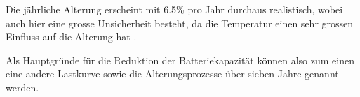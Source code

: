 Die jährliche Alterung erscheint mit 6.5\% pro Jahr durchaus realistisch, wobei auch hier eine grosse Unsicherheit besteht, da die Temperatur einen sehr grossen Einfluss auf die Alterung hat \cite{bat_alterung}.

Als Hauptgründe für die Reduktion der Batteriekapazität können also zum einen eine andere Lastkurve sowie die Alterungsprozesse über sieben Jahre genannt werden.

\newpage